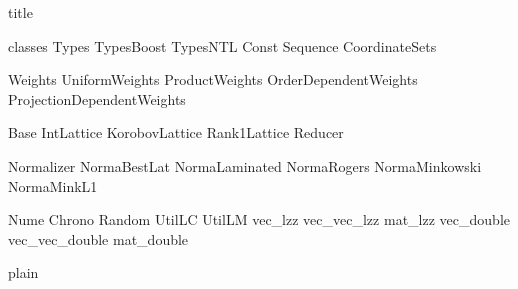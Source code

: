 \documentclass[11pt,draft]{report}
\begin{document}
 {title}

\tableofcontents
{}

 {classes}
 {Types}
 {TypesBoost}
 {TypesNTL}
 {Const}
 {Sequence}
 {CoordinateSets}

 {Weights}
 {UniformWeights}
 {ProductWeights}
 {OrderDependentWeights}
 {ProjectionDependentWeights}
%

 {Base}
 {IntLattice}
 {KorobovLattice}
 {Rank1Lattice}
 {Reducer}

 {Normalizer}
 {NormaBestLat}
 {NormaLaminated}
 {NormaRogers}
 {NormaMinkowski}
 {NormaMinkL1}

 {Nume}
 {Chrono}
 {Random}
 {UtilLC}
\ifdetailed
    {UtilLM}
    {vec_lzz}
    {vec_vec_lzz}
    {mat_lzz}
    {vec_double}
    {vec_vec_double}
    {mat_double}
\fi

 {plain}

\end{document}
